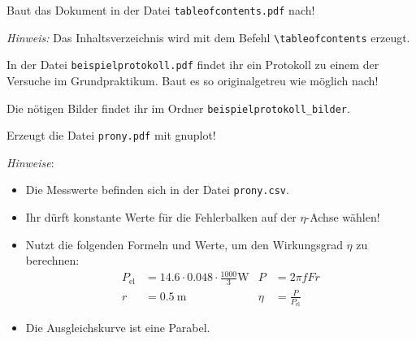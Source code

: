 \documentclass[a4paper, 12pt, headsepline, parskip=half-, headlines=3.1]{scrartcl}
\newcounter{aufgabe}
\newenvironment{aufgabe*}[1][]{\stepcounter{aufgabe}
\noindent\textbf{Aufgabe \arabic{aufgabe}.} #1}{\bigskip}
\begin{document}
\begin{aufgabe*}
Baut das Dokument in der Datei \texttt{tableofcontents.pdf} nach!

\emph{Hinweis:} Das Inhaltsverzeichnis wird mit dem Befehl \lstinline!\tableofcontents! erzeugt.
\end{aufgabe*}

\begin{aufgabe*}
In der Datei \texttt{beispielprotokoll.pdf} findet ihr ein Protokoll zu einem der Versuche im Grundpraktikum. Baut es so originalgetreu wie möglich nach!

Die nötigen Bilder findet ihr im Ordner \texttt{beispielprotokoll\_bilder}.
\end{aufgabe*}

\begin{aufgabe*}
	Erzeugt die Datei \texttt{prony.pdf} mit gnuplot!

	\emph{Hinweise}:
	\begin{itemize}
		\item Die Messwerte befinden sich in der Datei \texttt{prony.csv}.
		\item Ihr dürft konstante Werte für die Fehlerbalken auf der $η$-Achse wählen!
		\item Nutzt die folgenden Formeln und Werte, um den Wirkungsgrad $η$ zu berechnen:
		\begin{align*}
			P_\text{el} &= \num{14,6} ⋅ \num{0,048} ⋅ \frac{1000}{3} \si{\W} &
			P &= 2πfFr \\
			r &= \SI{0,5}{\m} &
			η &= \frac{P}{P_\text{el}}
		\end{align*}
		\item Die Ausgleichskurve ist eine Parabel.
	\end{itemize}
\end{aufgabe*}
\end{document}
